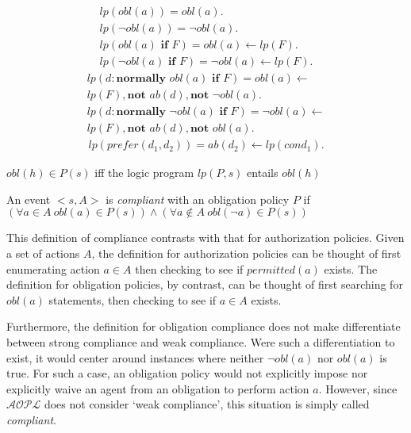 \begin{gather*}
    lp(obl(a)) =
        obl(a). \\
    lp(\neg obl(a)) =
        \neg obl(a). \\
    lp(obl(a) \textbf{ if } F) =
        obl(a) \leftarrow
            lp(F). \\
    lp(\neg obl(a) \textbf{ if } F) =
        \neg obl(a) \leftarrow
            lp(F).
\end{gather*}
\begin{multline*}
    lp(d: \textbf{normally } obl(a) \textbf{ if } F) =
        obl(a) \leftarrow \\
            lp(F),
            \textbf{not } ab(d),
            \textbf{not } \neg obl(a). \\
    lp(d: \textbf{normally } \neg obl(a) \textbf{ if } F) =
        \neg obl(a) \leftarrow \\
            lp(F),
            \textbf{not } ab(d),
            \textbf{not } obl(a).
\end{multline*}
\begin{gather*}
    lp(prefer(d_1, d_2)) =
        ab(d_2) \leftarrow lp(cond_1).
\end{gather*}

\begin{definition}
    $obl(h) \in P(s)$ iff the logic program $lp(P, s)$ entails $obl(h)$
\end{definition}

\begin{definition}
    An event $<s, A>$ is \textit{compliant} with an obligation policy $P$ if $(\forall a \in A \ obl(a) \in P(s)) \land (\forall a \not \in A \ obl(\neg a) \in P(s))$
\end{definition}

This definition of compliance contrasts with that for authorization policies.
Given a set of actions $A$, the definition for authorization policies can be thought of first enumerating action $a \in A$ then checking to see if $permitted(a)$ exists.
The definition for obligation policies, by contrast, can be thought of first searching for $obl(a)$ statements, then checking to see if $a \in A$ exists.

Furthermore, the definition for obligation compliance does not make differentiate between strong compliance and weak compliance.
Were such a differentiation to exist, it would center around instances where neither $\neg obl(a)$ nor $obl(a)$ is true.
For such a case, an obligation policy would not explicitly impose nor explicitly waive an agent from an obligation to perform action $a$.
However, since $\mathcal{AOPL}$ does not consider `weak compliance', this situation is simply called \textit{compliant}.

